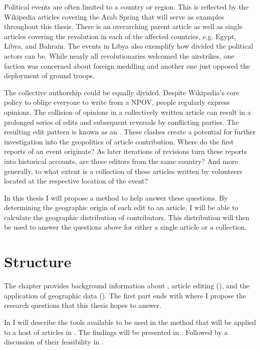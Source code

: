 Political events are often limited to a country or region. 
This is reflected by the Wikipedia articles covering the Arab Spring that will serve as examples throughout this thesis.
There is an overarching parent article  as well as single articles covering the revolution in each of the affected countries, e.g. Egypt, Libya, and Bahrain.
The events in Libya also exemplify how divided the political actors can be.
While nearly all revolutionaries welcomed the airstrikes, one faction was concerned about foreign meddling and another one just opposed the deployment of ground troops.\cite{econ18290470}

The collective authorship could be equally divided.
Despite Wikipedia's core policy to oblige everyone to write from a \ac{NPOV}, people regularly express opinions. 
The collision of opinions in a collectively written article can result in a prolonged series of edits and subsequent reversals by conflicting parties. 
The resulting edit pattern is known as an .\cite{suh2007us}
These clashes create a potential for further investigation into the geopolitics of article contribution.
Where do the first reports of an event originate?
As later iterations of revisions turn these reports into historical accounts, are these editors from the same country?
And more generally, to what extent is a collection of these articles written by volunteers located at the respective location of the event?

In this thesis I will propose a method to help answer these questions.
By determining the geographic origin of each edit to an article, I will be able to calculate the geographic distribution of contributors.
This distribution will then be used to answer the questions above for either a single article or a collection.


\section{Structure}


The chapter  provides background information about , article editing (), and the application of geographic data ().
The first part ends with  where I propose the research questions that this thesis hopes to answer.

In  I will describe the tools available to be used in the method that will be applied to a host of articles in .
The findings will be presented in .
Followed by a discussion of their feasibility in .